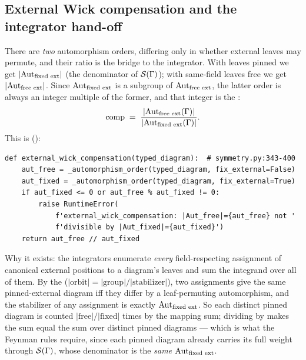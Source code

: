 \subsection{External Wick compensation and the integrator hand-off}\label{sec:ta-comp}

There are \emph{two} automorphism orders, differing only in whether external
leaves may permute, and their ratio is the bridge to the integrator. With leaves
pinned we get $|\mathrm{Aut}_{\text{fixed ext}}|$ (the denominator of $\mathcal{S}(\Gamma)$);
with same-field leaves free we get $|\mathrm{Aut}_{\text{free ext}}|$. Since
$\mathrm{Aut}_{\text{fixed ext}}$ is a subgroup of $\mathrm{Aut}_{\text{free ext}}$, the latter
order is always an integer multiple of the former, and that integer is the
:
\begin{equation}
  \mathrm{comp} \;=\;
  \frac{|\mathrm{Aut}_{\text{free ext}}(\Gamma)|}{|\mathrm{Aut}_{\text{fixed ext}}(\Gamma)|}.
  \label{eq:ta-comp}
\end{equation}
This is  ():

\begin{lstlisting}
def external_wick_compensation(typed_diagram):  # symmetry.py:343-400
    aut_free = _automorphism_order(typed_diagram, fix_external=False)
    aut_fixed = _automorphism_order(typed_diagram, fix_external=True)
    if aut_fixed <= 0 or aut_free % aut_fixed != 0:
        raise RuntimeError(
            f'external_wick_compensation: |Aut_free|={aut_free} not '
            f'divisible by |Aut_fixed|={aut_fixed}')
    return aut_free // aut_fixed
\end{lstlisting}

Why it exists: the integrators enumerate \emph{every} field-respecting assignment
of canonical external positions to a diagram's leaves and sum the integrand over
all of them. By the  ($|\text{orbit}| =
|\text{group}| / |\text{stabilizer}|$), two assignments give the same
pinned-external diagram iff they differ by a leaf-permuting automorphism, and the
stabilizer of any assignment is exactly $\mathrm{Aut}_{\text{fixed ext}}$. So each
distinct pinned diagram is counted $|\text{free}|/|\text{fixed}|$ times by the
mapping sum; dividing by  makes the sum equal the sum over distinct
pinned diagrams --- which is what the Feynman rules require, since each pinned
diagram already carries its full weight through $\mathcal{S}(\Gamma)$, whose denominator
is the \emph{same} $\mathrm{Aut}_{\text{fixed ext}}$.

